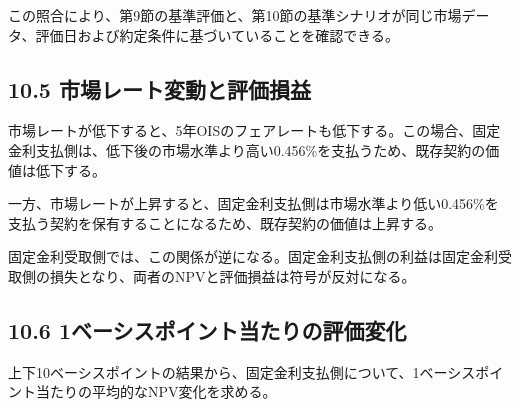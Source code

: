 \documentclass[
  letterpaper,
  DIV=11,
  numbers=noendperiod]{scrreprt}
\begin{document}
この照合により、第9節の基準評価と、第10節の基準シナリオが同じ市場データ、評価日および約定条件に基づいていることを確認できる。

\subsection{10.5
市場レート変動と評価損益}\label{ux5e02ux5834ux30ecux30fcux30c8ux5909ux52d5ux3068ux8a55ux4fa1ux640dux76ca}

市場レートが低下すると、5年OISのフェアレートも低下する。この場合、固定金利支払側は、低下後の市場水準より高い0.456\%を支払うため、既存契約の価値は低下する。

一方、市場レートが上昇すると、固定金利支払側は市場水準より低い0.456\%を支払う契約を保有することになるため、既存契約の価値は上昇する。

固定金利受取側では、この関係が逆になる。固定金利支払側の利益は固定金利受取側の損失となり、両者のNPVと評価損益は符号が反対になる。

\subsection{10.6
1ベーシスポイント当たりの評価変化}\label{ux30d9ux30fcux30b7ux30b9ux30ddux30a4ux30f3ux30c8ux5f53ux305fux308aux306eux8a55ux4fa1ux5909ux5316}

上下10ベーシスポイントの結果から、固定金利支払側について、1ベーシスポイント当たりの平均的なNPV変化を求める。
\end{document}
